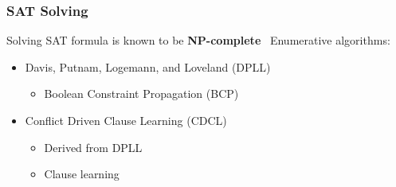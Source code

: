 \documentclass{beamer}
\begin{document}

\begin{frame}
\frametitle{SAT Solving}

	Solving SAT formula is known to be \textbf{NP-complete}~\cite{cook1971complexity}
	\vfill
	Enumerative algorithms:
	\begin{itemize}
		\item Davis, Putnam, Logemann, and Loveland (DPLL)~\cite{dpll_62}
		\begin{itemize}
			\item Boolean Constraint Propagation (BCP)
		\end{itemize}
	\vfill
		\item Conflict Driven Clause Learning (CDCL)~\cite{marques1999grasp}
		\begin{itemize}
			\item Derived from DPLL
			\item Clause learning
		\end{itemize}
	\end{itemize}
	
\end{frame}
%
%
\end{document}
